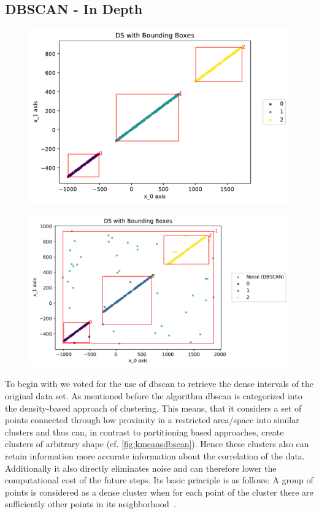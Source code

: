 \subsection{DBSCAN - In Depth}
\label{ssec:DBSCANindepth}
\begin{figure}
    \centering
    \begin{minipage}{.47\textwidth}
      \centering
      \includegraphics[width=.8\textwidth]{figures/DSwithDBSCANBoundingBoxes.pdf}
      \label{fig:cleandbscan}
    \end{minipage}%
    \begin{minipage}{.53 \textwidth}
      \centering
      \includegraphics[width=.8\textwidth]{figures/DBSCANwithNoise.pdf}
      \label{fig:noisydbscan}
    \end{minipage}
\end{figure}
To begin with we voted for the use of \gls{dbscan} to retrieve the dense intervals of the original data set. 
As mentioned before the algorithm \gls{dbscan} is categorized into the density-based approach of clustering. This means, that it considers a set of points connected through low proximity in a restricted area/space into similar clusters and thus can, in contrast to partitioning based approaches, create clusters of arbitrary shape (cf. \autoref{fig:kmeansdbscan}). Hence these clusters also can retain information more accurate information about the correlation of the data. Additionally it also directly eliminates noise and can therefore lower the computational cost of the future steps. Its basic principle is as follows:
A group of points is considered as a dense cluster when for each point of the cluster there are sufficiently other points in its neighborhood~\cite{DBSCANEKSX96}.


